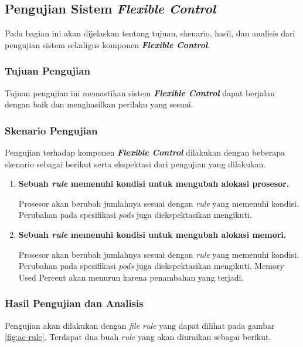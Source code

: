 \subsection{Pengujian Sistem \textit{Flexible Control}}

Pada bagian ini akan dijelaskan tentang tujuan, skenario, hasil, dan analisis dari pengujian sistem sekaligus komponen \textbf{\textit{Flexible Control}}.

\subsubsection{Tujuan Pengujian}

Tujuan pengujian ini memastikan sistem \textbf{\textit{Flexible Control}} dapat berjalan dengan baik dan menghasilkan perilaku yang sesuai.

\subsubsection{Skenario Pengujian}

Pengujian terhadap komponen \textbf{\textit{Flexible Control}} dilakukan dengan beberapa skenario sebagai berikut serta ekspektasi dari pengujian yang dilakukan.
\begin{enumerate}
  \item \bfseries Sebuah \textit{rule} memenuhi kondisi untuk mengubah alokasi prosesor.\normalfont

        Prosesor akan berubah jumlahnya sesuai dengan \textit{rule} yang memenuhi kondisi. Perubahan pada spesifikasi \textit{pods} juga diekspektasikan mengikuti.

  \item \bfseries Sebuah \textit{rule} memenuhi kondisi untuk mengubah alokasi memori.\normalfont

        Prosesor akan berubah jumlahnya sesuai dengan \textit{rule} yang memenuhi kondisi. Perubahan pada spesifikasi \textit{pods} juga diekspektasikan mengikuti. Memory Used Percent akan menurun karena penambahan yang terjadi.
\end{enumerate}

\subsubsection{Hasil Pengujian dan Analisis}

Pengujian akan dilakukan dengan \textit{file rule} yang dapat dilihat pada gambar \ref{fig:ac-rule}. Terdapat dua buah \textit{rule} yang akan diuraikan sebagai berikut.

